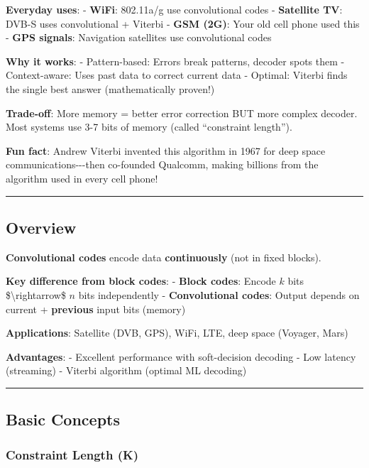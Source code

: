 \textbf{Everyday uses}: - \textbf{WiFi}: 802.11a/g use convolutional
codes - \textbf{Satellite TV}: DVB-S uses convolutional + Viterbi -
\textbf{GSM (2G)}: Your old cell phone used this - \textbf{GPS signals}:
Navigation satellites use convolutional codes

\textbf{Why it works}: - Pattern-based: Errors break patterns, decoder
spots them - Context-aware: Uses past data to correct current data -
Optimal: Viterbi finds the single best answer (mathematically proven!)

\textbf{Trade-off}: More memory = better error correction BUT more
complex decoder. Most systems use 3-7 bits of memory (called
``constraint length'').

\textbf{Fun fact}: Andrew Viterbi invented this algorithm in 1967 for
deep space communications-\/-\/-then co-founded Qualcomm, making
billions from the algorithm used in every cell phone!

\begin{center}\rule{0.5\linewidth}{0.5pt}\end{center}

\subsection{Overview}\label{overview}

\textbf{Convolutional codes} encode data \textbf{continuously} (not in
fixed blocks).

\textbf{Key difference from block codes}: - \textbf{Block codes}: Encode
\(k\) bits \$\textbackslash rightarrow\$ \(n\) bits independently -
\textbf{Convolutional codes}: Output depends on current +
\textbf{previous} input bits (memory)

\textbf{Applications}: Satellite (DVB, GPS), WiFi, LTE, deep space
(Voyager, Mars)

\textbf{Advantages}: - Excellent performance with soft-decision decoding
- Low latency (streaming) - Viterbi algorithm (optimal ML decoding)

\begin{center}\rule{0.5\linewidth}{0.5pt}\end{center}

\subsection{Basic Concepts}\label{basic-concepts}

\subsubsection{Constraint Length (K)}\label{constraint-length-k}

